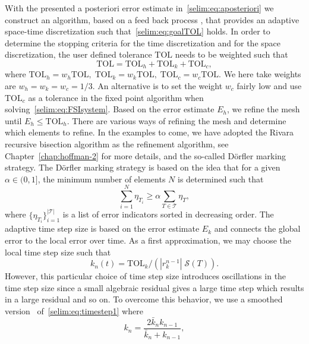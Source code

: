 With the presented a posteriori error estimate
in~\eqref{selim:eq:aposteriori} we construct an algorithm, based on a
feed back process , that provides an adaptive space-time
discretization such that~\eqref{selim:eq:goalTOL} holds. In order to
determine the stopping criteria for the time discretization and for
the space discretization, the user defined tolerance $\mathrm{TOL}$
needs to be weighted such that
\begin{equation}
\mathrm{TOL} = \mathrm{TOL}_h + \mathrm{TOL}_k + \mathrm{TOL}_c,
\end{equation}
where $\mathrm{TOL}_h = w_h \mathrm{TOL}, \;\mathrm{TOL}_k = w_k
\mathrm{TOL}, \;\mathrm{TOL}_c = w_c \mathrm{TOL}$.  We here take
weights are $w_h = w_k = w_c = 1/3$. An alternative is to set the
weight $w_c$ fairly low and use $\mathrm{TOL}_c$ as a tolerance in the
fixed point algorithm when solving~\eqref{selim:eq:FSIsystem}. Based
on the error estimate $E_h$, we refine the mesh until $E_h \leq
\mathrm{TOL}_h$.  There are various ways of refining the mesh and
determine which elements to refine. In the examples to come, we have
adopted the Rivara recursive bisection algorithm as the refinement
algorithm, see Chapter~\ref{chap:hoffman-2} for more details, and the
so-called D\"{o}rfler \cite{dorfler1996} marking strategy. The
D\"{o}rfler marking strategy is based on the idea that for a given
$\alpha\in(0,1]$, the minimum number of elements $N$ is determined
such that
\begin{equation}
  \label{selim:eq:dorfler}
\sum_{i=1}^{N}\eta_{T_i} \geq  \alpha \sum_{T\in\mathcal{T}}\eta_T ,
\end{equation}
where $\{ \eta_{T_{i}}\}_{i = 1}^{|\mathcal{T}|}$ is a list of error
indicators sorted in decreasing order.  The adaptive time step size is
based on the error estimate $E_k$ and connects the global error to the
local error over time. As a first approximation, we may choose the
local time step size such that
\begin{equation}
\label{selim:eq:timestep1}
k_n(t) = \mathrm{TOL}_k /(| r_k^{n-1} |\; \mathcal{S}(T)).
\end{equation}
However, this particular choice of time step
size introduces oscillations in the time step size since a small
algebraic residual gives a large time step which results in a large
residual and so on. To overcome this behavior, we use a smoothed
version~\cite{Logg2003d} of~\eqref{selim:eq:timestep1} where
\begin{equation}
\label{selim:eq:timestep2}
k_n = \frac{2\bar{k}_n k_{n-1}}{\bar{k}_n + k_{n-1}},
\end{equation}
